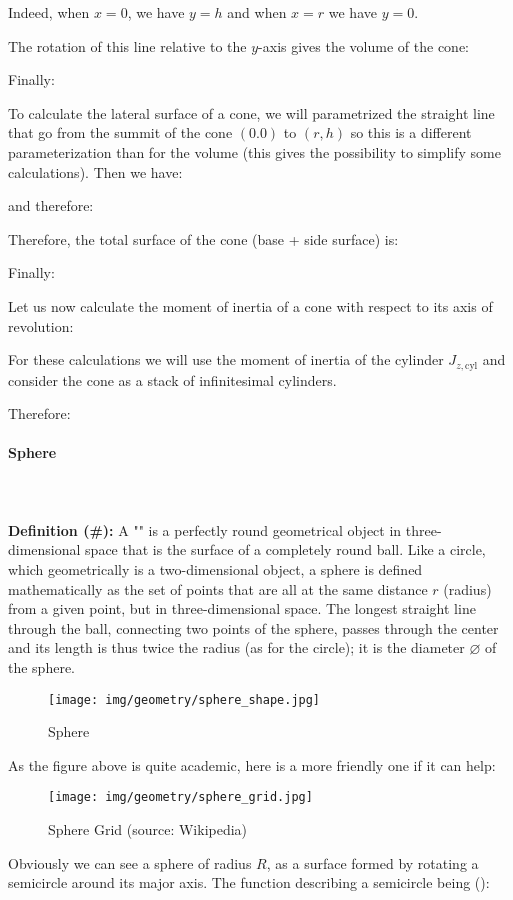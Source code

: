 {	Indeed, when $x=0$, we have $y=h$ and when $x=r$ we have $y=0$.
	
	The rotation of this line relative to the $y$-axis gives the volume of the cone:
	
	Finally:
	
	To calculate the lateral surface of a cone, we will parametrized the straight line that go from the summit of the cone $(0.0)$ to $(r, h)$ so this is a different parameterization than for the volume (this gives the possibility to simplify some calculations). Then we have:
	
	and therefore:
	
	Therefore, the total surface of the cone (base + side surface) is:
	
	Finally:
	
	Let us now calculate the moment of inertia of a cone with respect to its axis of revolution:

	For these calculations we will use the moment of inertia of the cylinder $J_{z,\text{cyl}}$ and consider the cone as a stack of infinitesimal cylinders.
	
	Therefore:
	
	
	\pagebreak
	\paragraph{Sphere}\mbox{}\\\\
	\textbf{Definition (\#\mydef):} A "\label{sphere}" is a perfectly round geometrical object in three-dimensional space that is the surface of a completely round ball. Like a circle, which geometrically is a two-dimensional object, a sphere is defined mathematically as the set of points that are all at the same distance $r$ (radius) from a given point, but in three-dimensional space. The longest straight line through the ball, connecting two points of the sphere, passes through the center and its length is thus twice the radius (as for the circle); it is the diameter $\varnothing$ of the sphere.
	\begin{figure}[H]
		\centering
		\texttt{[image: img/geometry/sphere\_shape.jpg]}
		\caption{Sphere}
	\end{figure}
	As the figure above is quite academic, here is a more friendly one if it can help:
	\begin{figure}[H]
		\centering
		\texttt{[image: img/geometry/sphere\_grid.jpg]}
		\caption[Sphere Grid]{Sphere Grid (source: Wikipedia)}
	\end{figure}
	Obviously we can see a sphere of radius $R$, as a surface formed by rotating a semicircle around its major axis. The function describing a semicircle being ():
	
}
